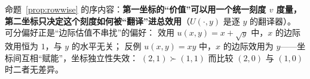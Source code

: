 \begin{remark}
命题~\ref{prop:rowwise} 的序内容：\textbf{第一坐标的“价值”可以用一个统一刻度 $v$ 度量，
第二坐标只决定这个刻度如何被“翻译”进总效用}（$U(\cdot,y)$ 是逐 $y$ 的翻译器）。
可分偏好正是“边际估值不串扰”的偏好：
效用 $u(x,y)=x+\sqrt{y}$ 中，$x$ 的边际效用恒为 $1$，与 $y$ 的水平无关；
反例 $u(x,y)=xy$ 中，$x$ 的边际效用为 $y$——坐标间互相“赋能”，坐标独立性失效：
$(2,1)\succ(1,1)$ 而比较 $(2,0)$ 与 $(1,0)$ 时二者无差异。
\end{remark}

